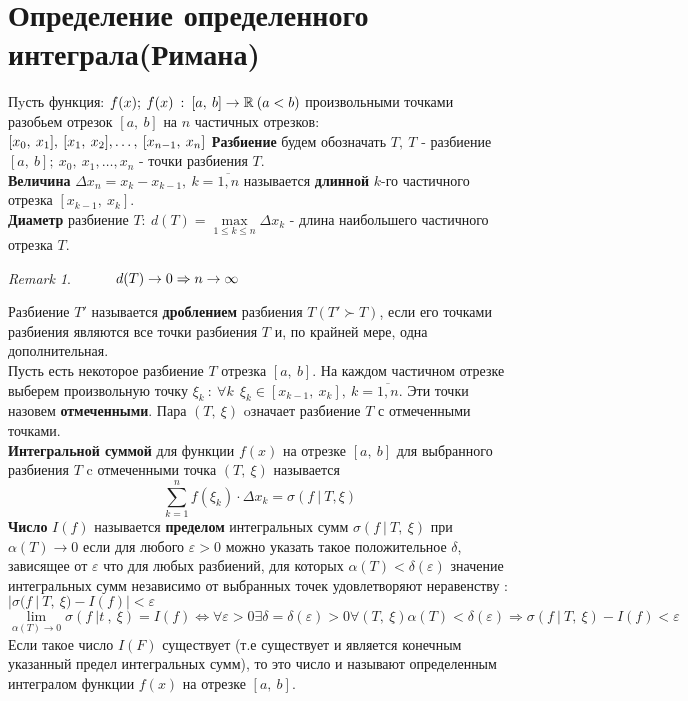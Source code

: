 \documentclass[a4paper,12pt]{bookest}
\theoremstyle{remark}
\newtheorem*{remark}{Remark}
\newcommand\tab[1][1cm]{\hspace*{#1}}
\begin{document}
\section{Определение определенного интеграла(Римана)}
Пyсть функция: $f(x);\> f(x)\>:\>[a,\>b]\rightarrow\mathbb{R}\>(a<b)\\$
произвольными точками разобьем отрезок $[a,\>b]$ на $n$ частичных отрезков: $[x_0,\>x_1],\>[x_1,\>x_2],\dots,\>[x_{n-1},\>x_n]\\$ 
\textbf{Разбиение} будем обозначать $T,\>T$ - разбиение $[a,\>b];\>x_0,\>x_1,\dots,x_n$ - точки разбиения $T$.\\
\textbf{Величина} $\Delta x_n=x_k-x_{k-1},\>k=\overline{1,n}$ называется \textbf{длинной} $k$-го частичного отрезка $[x_{k-1},\>x_k]$.\\
\textbf{Диаметр} разбиение $T:\>d(T)=\underset{1\leq k\leq n}{\max}\Delta x_k$ - длина наибольшего частичного отрезка $T$.\\
\begin{remark}
	$\tab d(T)\rightarrow0\Rightarrow n\rightarrow\infty$
\end{remark}
Разбиение $T'$ называется \textbf{дроблением} разбиения $T(T'\succ T)$, если его точками разбиения являются все точки разбиения $T$ и, по крайней мере, одна дополнительная.\\
Пусть есть некоторое разбиение $T$ отрезка $[a,\>b]$. На каждом частичном отрезке выберем произвольную точку $\xi_k\>:\>\forall k\>\> \xi_k \in [x_{k-1},\>x_k],\>k=\overline{1,n}.$
Эти точки назовем \textbf{отмеченными}. Пара $(T,\>\xi)$ oзначает разбиение $T$ с отмеченными точками.\\
\textbf{Интегральной суммой} для функции $f(x)$ на отрезке $[a,\>b]$ для выбранного разбиения $T$ c отмеченными точка $(T,\>\xi)$ называется 
$$\sum\limits_{k=1}^n f(\xi_k)\cdot\Delta x_k=\sigma(f\>|\>T,\xi)$$
\textbf{Число} $I(f)$ называется \textbf{пределом} интегральных сумм $\sigma(f\>|\>T,\>\xi)$ при $\alpha(T)\to0$ если для любого $\varepsilon>0$ можно указать такое положительное $\delta$, зависящее от $\varepsilon$ что для любых разбиений, для которых $\alpha(T)<\delta(\varepsilon)$ значение интегральных сумм независимо от выбранных точек удовлетворяют неравенству : $|\sigma(f\>|\>T,\>\xi)-I(f)|<\varepsilon$
$$\lim_{\alpha(T)\to0}\sigma(f\>|t\>,\>\xi)=I(f)\Leftrightarrow\forall\varepsilon>0\exists\delta=\delta(\varepsilon)>0\forall(T,\>\xi)\alpha(T)<\delta(\varepsilon)\Rightarrow\sigma(f\>|\>T,\>\xi)-I(f)<\varepsilon$$
Если такое число $I(F)$ существует (т.е существует и является конечным указанный предел интегральных сумм), то это число и называют определенным интегралом функции $f(x)$ на отрезке $[a,\>b]$.
\end{document}
